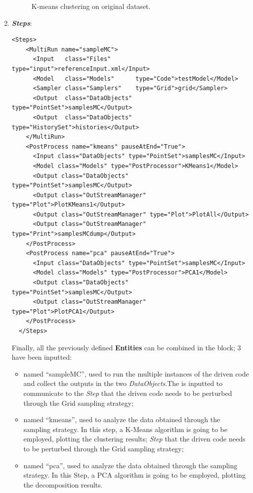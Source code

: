 \begin{enumerate}
\begin{figure}[h!]
  \caption{K-means clustering on original dataset.}
  \label{fig:KmeanOrigData}
 \end{figure}
   \item \textbf{\textit{Steps}}:   
\begin{lstlisting}[style=XML,morekeywords={arg,extension,pauseAtEnd,overwrite}]
  <Steps>
    <MultiRun name="sampleMC">
      <Input   class="Files"       type="input">referenceInput.xml</Input>
      <Model   class="Models"      type="Code">testModel</Model>
      <Sampler class="Samplers"    type="Grid">grid</Sampler>
      <Output  class="DataObjects" type="PointSet">samplesMC</Output>
      <Output  class="DataObjects" type="HistorySet">histories</Output>
    </MultiRun>
    <PostProcess name="kmeans" pauseAtEnd="True">
      <Input class="DataObjects" type="PointSet">samplesMC</Input>
      <Model class="Models" type="PostProcessor">KMeans1</Model>
      <Output class="DataObjects" type="PointSet">samplesMC</Output>
      <Output class="OutStreamManager" type="Plot">PlotKMeans1</Output>
      <Output class="OutStreamManager" type="Plot">PlotAll</Output>
      <Output class="OutStreamManager" type="Print">samplesMCdump</Output>
    </PostProcess>
    <PostProcess name="pca" pauseAtEnd="True">
      <Input class="DataObjects" type="PointSet">samplesMC</Input>
      <Model class="Models" type="PostProcessor">PCA1</Model>
      <Output class="DataObjects" type="PointSet">samplesMC</Output>
      <Output class="OutStreamManager" type="Plot">PlotPCA1</Output>
    </PostProcess>
  </Steps>
\end{lstlisting}

   Finally, all the previously defined \textbf{Entities} can be combined in 
   the  block; 
   3  have been inputted:
   \begin{itemize}
     \item {} named ``sampleMC'', used to run the 
     multiple  
     instances of the driven code and 
     collect the outputs in the two \textit{DataObjects}.The  is inputted to communicate to the 
     \textit{Step} that the driven code needs to
     be perturbed through the Grid sampling strategy;
     \item {} named ``kmeans'', used
     to analyze the data obtained through the sampling strategy. In
     this step, a K-Means algorithm is going to be employed, plotting
     the clustering results;
     \textit{Step} that the driven code needs to
     be perturbed through the Grid sampling strategy;
     \item {} named ``pca'', used
     to analyze the data obtained through the sampling strategy. In
     this Step, a PCA algorithm is going to be employed, plotting
     the decomposition results.
   \end{itemize}
\end{enumerate} 
